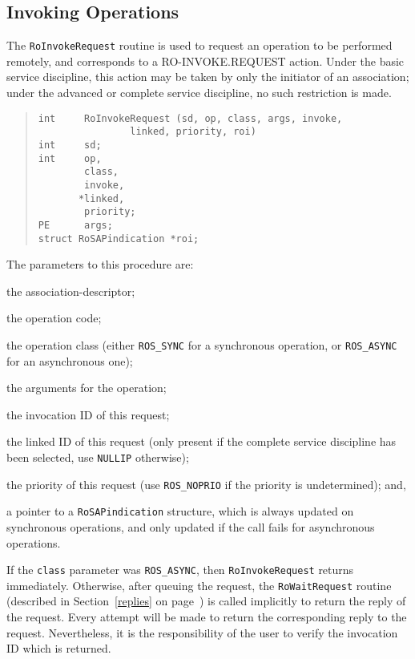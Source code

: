 \subsection     {Invoking Operations}
The \verb"RoInvokeRequest" routine is used to request an operation to be
performed remotely,
and corresponds to a {\sf RO-INVOKE.REQUEST\/} action.
Under the basic service discipline,
this action may be taken by only the initiator of an association;
under the advanced or complete service discipline,
no such restriction is made.
\begin{quote}\small\begin{verbatim}
int     RoInvokeRequest (sd, op, class, args, invoke,
                linked, priority, roi)
int     sd;
int     op,
        class,
        invoke,
       *linked,
        priority;
PE      args;
struct RoSAPindication *roi;
\end{verbatim}\end{quote}
The parameters to this procedure are:
\begin{describe}
\item[\verb"sd":] the association-descriptor;

\item[\verb"op":] the operation code;

\item[\verb"class":] the operation class
(either \verb"ROS_SYNC" for a synchronous operation,
or \verb"ROS_ASYNC" for an asynchronous one);

\item[\verb"args":] the arguments for the operation;

\item[\verb"invoke":] the invocation ID of this request;

\item[\verb"linked":] the linked ID of this request
(only present if the complete service discipline has been selected,
use \verb"NULLIP" otherwise);

\item[\verb"priority":] the priority of this request
(use \verb"ROS_NOPRIO" if the priority is undetermined);
and,

\item[\verb"roi":] a pointer to a \verb"RoSAPindication" structure, which is
always updated on synchronous operations,
and only updated if the call fails for asynchronous operations.
\end{describe}
If the \verb"class" parameter was \verb"ROS_ASYNC",
then \verb"RoInvokeRequest" returns immediately.
Otherwise,
after queuing the request,
the \verb"RoWaitRequest" routine
(described in Section~\ref{replies} on page~\pageref{replies})
is called implicitly to return the reply of the request.
Every attempt will be made to return the corresponding reply to the request.
Nevertheless,
it is the responsibility of the user to verify the invocation ID which is
returned.

